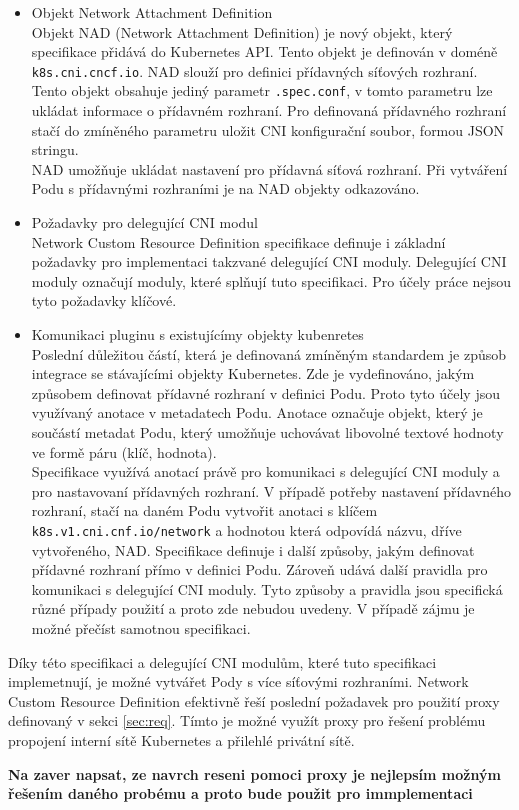 \begin{itemize}
    \item Objekt Network Attachment Definition\\
    Objekt NAD (Network Attachment Definition) je nový objekt, který specifikace přidává do Kubernetes API. Tento objekt je definován v doméně \verb|k8s.cni.cncf.io|. NAD slouží pro definici přídavných síťových rozhraní. Tento objekt obsahuje jediný parametr \verb|.spec.conf|, v tomto parametru lze ukládat informace o přídavném rozhraní. Pro definovaná přídavného rozhraní stačí do zmíněného parametru uložit CNI konfigurační soubor, formou JSON stringu.\\
    NAD umožňuje ukládat nastavení pro přídavná síťová rozhraní. Při vytváření Podu s přídavnými rozhraními je na NAD objekty odkazováno.
    \item Požadavky pro delegující CNI modul\\
    Network Custom Resource Definition specifikace definuje i základní požadavky pro implementaci takzvané delegující CNI moduly. Delegující CNI moduly označují moduly, které splňují tuto specifikaci. Pro účely práce nejsou tyto požadavky klíčové.    
    \item Komunikaci pluginu s existujícímy objekty kubenretes\\
    Poslední důležitou částí, která je definovaná zmíněným standardem je způsob integrace se stávajícími objekty Kubernetes. Zde je vydefinováno, jakým způsobem definovat přídavné rozhraní v definici Podu. Proto tyto účely jsou využívaný anotace v metadatech Podu. Anotace označuje objekt, který je součástí metadat Podu, který umožňuje uchovávat libovolné textové hodnoty ve formě páru (klíč, hodnota).\\
    Specifikace využívá anotací právě pro komunikaci s delegující CNI moduly a pro nastavovaní přídavných rozhraní. V případě potřeby nastavení přídavného rozhraní, stačí na daném Podu vytvořit anotaci s klíčem \verb|k8s.v1.cni.cnf.io/network| a hodnotou která odpovídá názvu, dříve vytvořeného, NAD.
    Specifikace definuje i další způsoby, jakým definovat přídavné rozhraní přímo v definici Podu. Zároveň udává další pravidla pro komunikaci s delegující CNI moduly. Tyto způsoby a pravidla jsou specifická různé případy použití a proto zde nebudou uvedeny. V případě zájmu je možné přečíst samotnou specifikaci. 
\end{itemize}
Díky této specifikaci a delegující CNI modulům, které tuto specifikaci implemetnují, je možné vytvářet Pody s více síťovými rozhraními. Network Custom Resource Definition efektivně řeší poslední požadavek pro použití proxy definovaný v sekci \ref{sec:req}. Tímto je možné využít proxy pro řešení problému propojení interní sítě Kubernetes a přilehlé privátní sítě.

\textbf{Na zaver napsat, ze navrch reseni pomoci proxy je nejlepsím možným řešením daného probému a proto bude použit pro immplementaci}


